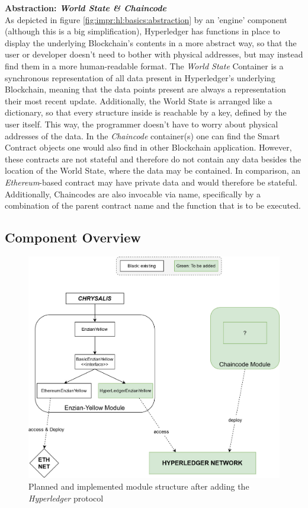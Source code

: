 \textbf{Abstraction: \emph{World State \& Chaincode}} \\[0.2em]
As depicted in figure \ref{fig:impr:hl:basics:abstraction} by an 'engine' component (although this is a big simplification), Hyperledger has functions in place to display the underlying Blockchain's contents in a more abstract way, so that the user or developer doesn't need to bother with physical addresses, but may instead find them in a more human-readable format. \newline
The \emph{World State} Container is a synchronous representation of all data present in Hyperledger's underlying Blockchain, meaning that the data points present are always a representation their most recent update. Additionally, the World State is arranged like a dictionary, so that every structure inside is reachable by a key, defined by the user itself. This way, the programmer doesn't have to worry about physical addresses of the data. \newline
In the \emph{Chaincode} container(s) one can find the Smart Contract objects one would also find in other Blockchain application. However, these contracts are not stateful and therefore do not contain any data besides the location of the World State, where the data may be contained. In comparison, an \emph{Ethereum}-based contract may have private data and would therefore be stateful. Additionally, Chaincodes are also invocable via name, specifically by a combination of the parent contract name and the function that is to be executed.

\subsection{Component Overview}
\label{sec:impr:hl:requirements}

\begin{figure}[h]
	\centering
	\captionsetup{justification=centering,margin=2cm}
	\includegraphics[width=\textwidth]{gfx/hl-structure}
	\caption{Planned and implemented module structure after adding the \emph{Hyperledger} protocol}
	\label{fig:impr:hl:structure}
\end{figure}

